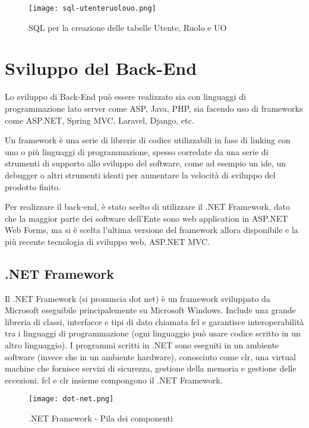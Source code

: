 \begin{figure}[H]
    \centering
    \texttt{[image: sql-utenteruolouo.png]}
    \caption{SQL per la creazione delle tabelle Utente, Ruolo e UO}
    \label{fig:SqlUtenteRuoloUo}
\end{figure}


\section{Sviluppo del Back-End}

Lo sviluppo di Back-End può essere realizzato sia con linguaggi di programmazione lato server come ASP, Java, PHP, sia facendo uso di frameworks come ASP.NET, Spring MVC, Laravel, Django, etc. 

Un framework è una serie di librerie di codice utilizzabili in fase di linking con uno o più linguaggi di programmazione, spesso corredate da una serie di strumenti di supporto allo sviluppo del software, come ad esempio un \Gls{ide}, un debugger o altri strumenti ideati per aumentare la velocità di sviluppo del prodotto finito.

Per realizzare il back-end, è stato scelto di utilizzare il .NET Framework, dato che la maggior parte dei software dell'Ente sono web application in ASP.NET Web Forms, ma si è scelta l'ultima versione del framework allora disponibile e la più recente tecnologia di sviluppo web, ASP.NET MVC.


\subsection{.NET Framework}

Il .NET Framework (si pronuncia dot net) è un framework sviluppato da Microsoft eseguibile principalemente su Microsoft Windows.
Include una grande libreria di classi, interfacce e tipi di dato chiamata \Gls{fcl} e garantisce interoperabilità tra i linguaggi di programmazione (ogni linguaggio può usare codice scritto in un altro linguaggio).
I programmi scritti in .NET sono eseguiti in un ambiente software (invece che in un ambiente hardware), conosciuto come \Gls{clr}, una virtual machine che fornisce servizi di sicurezza, gestione della memoria e gestione delle eccezioni.
\Gls{fcl} e \Gls{clr} insieme compongono il .NET Framework.

\begin{figure}[H]
    \centering
    \texttt{[image: dot-net.png]}
    \caption{.NET Framework - Pila dei componenti}
    \label{fig:DotNet}
\end{figure}


